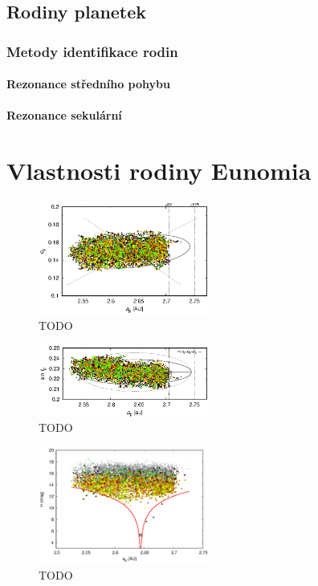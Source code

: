 \documentclass[A4paper, 12pt, oneside]{book}
\begin{document}
\section{Rodiny planetek}
\subsection{Metody identifikace rodin}
\subsubsection{Rezonance středního pohybu}
\subsubsection{Rezonance sekulární}

\chapter{Vlastnosti rodiny Eunomia}
\begin{figure}
	\centering
	\includegraphics[width=0.5\textwidth]{obr/ae_wise}
	\caption{TODO}
	\label{ae_wise}
\end{figure}
\begin{figure}
	\centering
	\includegraphics[width=0.5\textwidth]{obr/ai_wise}
	\caption{TODO}
	\label{ai_wise}
\end{figure}
\begin{figure}
	\centering
	\includegraphics[width=0.5\textwidth]{obr/aH_wise}
	\caption{TODO}
	\label{aH_wise}
\end{figure}
\end{document}

